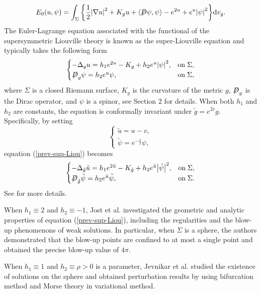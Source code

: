 \documentclass[a4paper, 12pt]{article}
\def\slashiii#1{\setbox0=\hbox{$#1$}#1\hskip-\wd0\hbox to\wd0{\hss\sl/\/\hss}}
\begin{document}
	$$
	E_0(u,\psi ) = \int_\Sigma {\left\{ {\frac{1}{2}{{\left| {\nabla u} \right|}^2} + {K_g}u + \left\langle { \slashiii{D}\psi ,\psi } \right\rangle  - {e^{2u}} + {e^u}{{\left| \psi  \right|}^2}} \right\}} {\text{d}}{v_g}.
	$$
	The Euler-Lagrange equation associated with the functional of the supersymmetric Liouville theory is known as the super-Liouville equation and typically takes the following form
	\begin{equation}\label{prev-sup-Liou}
		\begin{cases}
			{ - \Delta_g u =h_1{e^{2u}}- {K_g}+h_2 {e^{u}}{{\left| \psi    \right|^2}}}  ,&{{\text{on}}\;{\Sigma},} \\
			{\slashiii{D}_g\psi    = h_2{e^{u}}\psi  },&{{\text{on}}\;{\Sigma},}
		\end{cases}
	\end{equation}
	where $\Sigma$ is a closed Riemann surface, $K_g$ is the curvature of the metric $g$, $\slashiii{D}_g$ is the Dirac operator, and $\psi$ is a spinor, see Section 2 for details. When both $h_1$ and $h_2$ are constants, the equation is conformally invariant under $\widetilde{g}=e^{2v}g$. Specifically, by setting
	$$
	\begin{cases}
		{\tilde u = u - v,} \\
		{\tilde \psi  = {e^{-\frac{v}{2}}}\psi ,}
	\end{cases}
	$$
	equation (\ref{prev-sup-Liou}) becomes
	\begin{equation*}
		\begin{cases}
			{ - {\Delta _{\tilde g}}\tilde u = {h_1}{e^{2\tilde u}} - {K_{\tilde g}}+ {h_2}{e^{\tilde u}}{{\left| {\tilde \psi} \right|}^2} ,} &{{\text{on}}\;{\Sigma},} \\
			{{\slashiii{D}_{\tilde g}}\tilde \psi  = {h_2}{e^{\tilde u}}\tilde \psi ,} &{{\text{on}}\;{\Sigma}.}
		\end{cases}
	\end{equation*}	
	See \cite{jost2007super} for more details.
	
	When ${h_1} \equiv 2$ and ${h_2}  \equiv  - 1$, Jost et al. \cite{jost2007super,jost2009energy} investigated the geometric and analytic properties of equation (\ref{prev-sup-Liou}), including the regularities and the blow-up phenomenons of weak solutions. In particular, when \( \Sigma \) is a sphere, the authors demonstrated that the blow-up points are confined to at most a single point and obtained the precise blow-up value of \( 4\pi \).
	
	When $h_1 \equiv1$ and $h_2 \equiv \rho>0$ is a parameter, Jevnikar et al. \cite{MR4206467} studied the existence of solutions on the sphere and obtained perturbation results by using bifurcation method and Morse theory in variational method.
	
\end{document}
